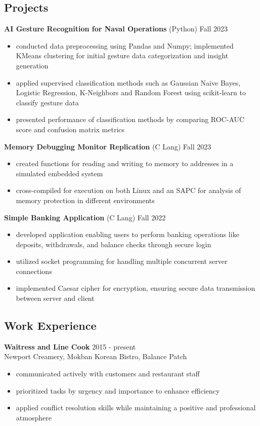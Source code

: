 \documentclass[11pt, letterpaper]{article}
\begin{document}
\subsection*{\color{accent} Projects \xdotfill[.5ex]{.4pt}}
\textbf{AI Gesture Recognition for Naval Operations}
\enspace\textbullet\enspace (Python)
\hfill Fall 2023
\begin{itemize}[itemsep=0.75pt]
\item conducted data preprocessing using Pandas and Numpy; implemented KMeans clustering for initial gesture data categorization and insight generation
\item applied supervised classification methods such as Gaussian Naive Bayes, Logistic Regression, K-Neighbors and Random Forest using scikit-learn to classify gesture data
\item presented performance of classification methods by comparing ROC-AUC score and confusion matrix metrics
\end{itemize}
\textbf{Memory Debugging Monitor Replication}
\enspace\textbullet\enspace (C Lang)
\hfill Fall 2023
\begin{itemize}[itemsep=0.75pt]
\item created functions for reading and writing to memory to addresses in a simulated embedded system
\item cross-compiled for execution on both Linux and an SAPC for analysis of memory protection in different environments
\end{itemize}
\textbf{Simple Banking Application}
\enspace\textbullet\enspace (C Lang)
\hfill Fall 2022
\begin{itemize}[itemsep=0.75pt]
\item developed application enabling users to perform banking operations like deposits, withdrawals, and balance checks through secure login
\item utilized socket programming for handling multiple concurrent server connections
\item implemented Caesar cipher for encryption, ensuring secure data transmission between server and client
\end{itemize} 

\subsection*{\color{accent} Work Experience \xdotfill[.5ex]{.4pt}}
\textbf{Waitress and Line Cook} \hfill 2015 - present \\
Newport Creamery, Mokban Korean Bistro, Balance Patch
\begin{itemize}[noitemsep]
\item communicated actively with customers and restaurant staff
\item prioritized tasks by urgency and importance to enhance efficiency
\item applied conflict resolution skills while maintaining a positive and professional atmosphere
\end{itemize}
\end{document}
